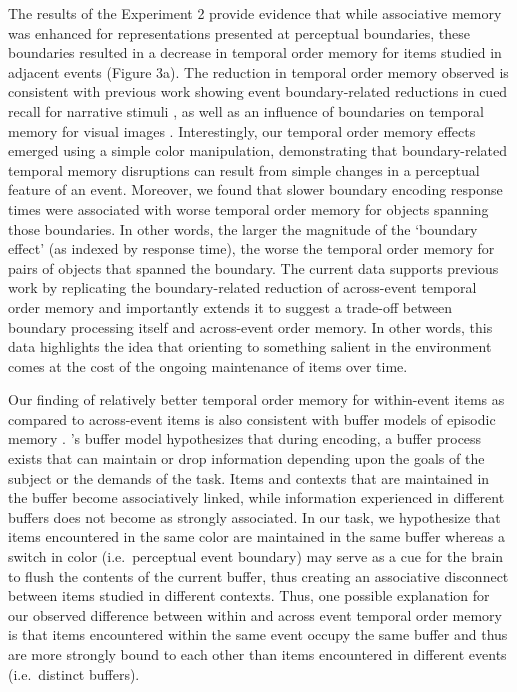 The results of the Experiment 2 provide evidence that while associative
memory was enhanced for representations presented at perceptual
boundaries, these boundaries resulted in a decrease in temporal order
memory for items studied in adjacent events (Figure 3a). The reduction
in temporal order memory observed is consistent with previous work
showing event boundary-related reductions in cued recall for narrative
stimuli \autocite{ezzyat_what_2011}, as well as an influence of
boundaries on temporal memory for visual images
\autocites{dubrow_influence_2013}{ezzyat_similarity_2014}.
Interestingly, our temporal order memory effects emerged using a simple
color manipulation, demonstrating that boundary-related temporal memory
disruptions can result from simple changes in a perceptual feature of an
event. Moreover, we found that slower boundary encoding response times
were associated with worse temporal order memory for objects spanning
those boundaries. In other words, the larger the magnitude of the
`boundary effect' (as indexed by response time), the worse the temporal
order memory for pairs of objects that spanned the boundary. The current
data supports previous work by replicating the boundary-related
reduction of across-event temporal order memory and importantly extends
it to suggest a trade-off between boundary processing itself and
across-event order memory. In other words, this data highlights the idea
that orienting to something salient in the environment comes at the cost
of the ongoing maintenance of items over time.

Our finding of relatively better temporal order memory for within-event
items as compared to across-event items is also consistent with buffer
models of episodic memory
\autocites{atkinson_human_1968}{lehman_global_2009}{lehman_buffer_2013}{raaijmakers_search_1981}.
\textcite{lehman_buffer_2013} 's buffer model hypothesizes that during
encoding, a buffer process exists that can maintain or drop information
depending upon the goals of the subject or the demands of the task.
Items and contexts that are maintained in the buffer become
associatively linked, while information experienced in different buffers
does not become as strongly associated. In our task, we hypothesize that
items encountered in the same color are maintained in the same buffer
whereas a switch in color (i.e.~perceptual event boundary) may serve as
a cue for the brain to flush the contents of the current buffer, thus
creating an associative disconnect between items studied in different
contexts. Thus, one possible explanation for our observed difference
between within and across event temporal order memory is that items
encountered within the same event occupy the same buffer and thus are
more strongly bound to each other than items encountered in different
events (i.e.~distinct buffers).

